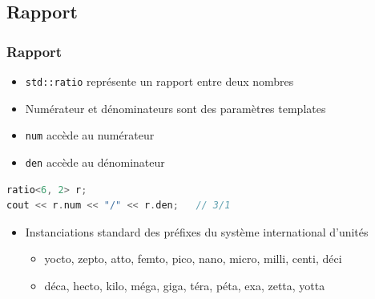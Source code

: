 \documentclass[C++.tex]{subfiles}
\begin{document}
\subsection*{Rapport}
\begin{frame}[fragile]
	\frametitle{Rapport}


	\begin{itemize}
		\item \lstinline|std::ratio| représente un rapport entre deux nombres
		\item Numérateur et dénominateurs sont des paramètres templates
		\item \lstinline|num| accède au numérateur
		\item \lstinline|den| accède au dénominateur
	\end{itemize}

	\begin{lstlisting}[language=C++]
ratio<6, 2> r;
cout << r.num << "/" << r.den;   // 3/1\end{lstlisting}

	\begin{itemize}
		\item Instanciations standard des préfixes du système international d'unités
		\begin{itemize}
			\item yocto, zepto, atto, femto, pico, nano, micro, milli, centi, déci
			\item déca, hecto, kilo, méga, giga, téra, péta, exa, zetta, yotta
		\end{itemize}
	\end{itemize}
\end{frame}
\end{document}
